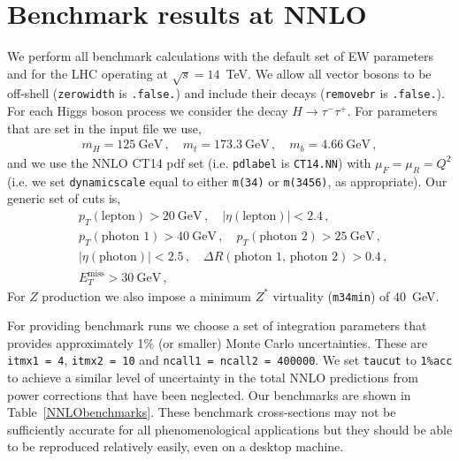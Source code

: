 \documentclass[12pt]{article}
\begin{document}
\section{Benchmark results at NNLO }
\label{sec:NNLO}
We perform all benchmark calculations with the default set of EW parameters
and for the LHC operating at $\sqrt s = 14$~TeV.  We allow all
vector bosons to be off-shell ({\tt zerowidth} is {\tt .false.})
and include their decays ({\tt removebr} is {\tt .false.}).
For each Higgs boson process we consider the decay $H \to \tau^- \tau^+$.
For parameters that are set in the input file we use,
\begin{eqnarray}
m_H = 125~\mbox{GeV} \,, \quad
m_t = 173.3~\mbox{GeV} \,, \quad 
m_b = 4.66~\mbox{GeV} \,, 
\end{eqnarray}
and we use the NNLO CT14 pdf set (i.e. {\tt pdlabel} is {\tt CT14.NN}) with
$\mu_F = \mu_R = Q^2$ (i.e. we set {\tt dynamicscale} equal to
either {\tt m(34)} or {\tt m(3456)}, as appropriate).
Our generic set of cuts is,
\begin{eqnarray}
&& p_T(\mbox{lepton}) > 20~\mbox{GeV} \,, \quad
|\eta(\mbox{lepton})| < 2.4 \,, \quad \nonumber \\
&& p_T(\mbox{photon 1}) > 40~\mbox{GeV} \,, \quad
   p_T(\mbox{photon 2}) > 25~\mbox{GeV} \,, \quad \nonumber \\
&&|\eta(\mbox{photon})| < 2.5 \,, \quad 
\Delta R(\mbox{photon 1, photon 2}) > 0.4 \,, \quad \nonumber \\
&& E_T^{\mbox{miss}} > 30~\mbox{GeV} \,, \quad
\end{eqnarray}
For $Z$ production we also impose a minimum $Z^*$ virtuality ({\tt m34min})
of $40$~GeV.

For providing benchmark runs we choose a set of integration parameters
that provides approximately 1\% (or smaller) Monte Carlo uncertainties.
These are {\tt itmx1 = 4}, {\tt itmx2 = 10} and {\tt ncall1 = ncall2 = 400000}.
We set {\tt taucut} to {\tt 1\%acc} to achieve a similar level of uncertainty
in the total NNLO predictions from power corrections that have been neglected. 
Our benchmarks are shown in Table~\ref{NNLObenchmarks}.  These benchmark cross-sections
may not be sufficiently accurate for all phenomenological applications but they should
be able to be reproduced relatively easily, even on a desktop machine.
\end{document}
